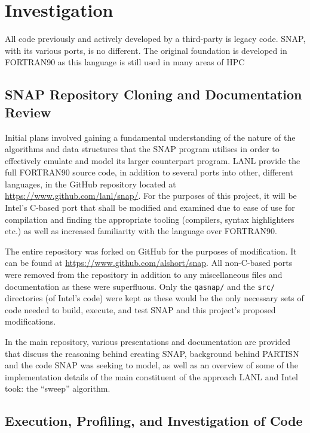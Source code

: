\documentclass[conference]{IEEEtran}
\begin{document}

\section{Investigation}
\label{sec:investigation}

All code previously and actively developed by a third-party is legacy code. SNAP, with its various ports, is no different. The original foundation is developed in FORTRAN90 as this language is still used in many areas of HPC 

\subsection{SNAP Repository Cloning and Documentation Review}

Initial plans involved gaining a fundamental understanding of the nature of the algorithms and data structures that the SNAP program utilises in order to effectively emulate and model its larger counterpart program. LANL provide the full FORTRAN90 source code, in addition to several ports into other, different languages, in the GitHub repository located at \url{https://www.github.com/lanl/snap/}. For the purposes of this project, it will be Intel's C-based port that shall be modified and examined due to ease of use for compilation and finding the appropriate tooling (compilers, syntax highlighters etc.) as well as increased familiarity with the language over FORTRAN90.

The entire repository was forked on GitHub for the purposes of modification. It can be found at \url{https://www.github.com/alshort/snap}. All non-C-based ports were removed from the repository in addition to any miscellaneous files and documentation as these were superfluous. Only the \texttt{qasnap/} and the \texttt{src/} directories (of Intel's code) were kept as these would be the only necessary sets of code needed to build, execute, and test SNAP and this project's proposed modifications.

In the main repository, various presentations and documentation are provided that discuss the reasoning behind creating SNAP, background behind PARTISN and the code SNAP was seeking to model, as well as an overview of some of the implementation details of the main constituent of the approach LANL and Intel took: the ``sweep'' algorithm.

\subsection{Execution, Profiling, and Investigation of Code}
\end{document}
